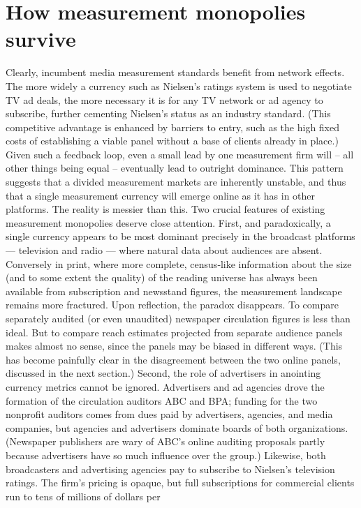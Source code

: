 \section{How measurement monopolies survive}
Clearly, incumbent media measurement standards benefit from network
effects. The more widely a currency such as Nielsen’s ratings system is
used to negotiate TV ad deals, the more necessary it is for any TV network
or ad agency to subscribe, further cementing Nielsen’s status as an
industry standard. (This competitive advantage is enhanced by barriers to
entry, such as the high fixed costs of establishing a viable panel without a
base of clients already in place.) Given such a feedback loop, even a small
lead by one measurement firm will – all other things being equal –
eventually lead to outright dominance. This pattern suggests that a
divided measurement markets are inherently unstable, and thus that a
single measurement currency will emerge online as it has in other
platforms.
The reality is messier than this. Two crucial features of existing
measurement monopolies deserve close attention. First, and
paradoxically, a single currency appears to be most dominant precisely in
the broadcast platforms — television and radio — where natural data
about audiences are absent. Conversely in print, where more complete,
census‐like information about the size (and to some extent the quality) of
the reading universe has always been available from subscription and
newsstand figures, the measurement landscape remains more fractured.
Upon reflection, the paradox disappears. To compare separately audited
(or even unaudited) newspaper circulation figures is less than ideal. But to
compare reach estimates projected from separate audience panels makes
almost no sense, since the panels may be biased in different ways. (This
has become painfully clear in the disagreement between the two online
panels, discussed in the next section.)
Second, the role of advertisers in anointing currency metrics cannot be
ignored. Advertisers and ad agencies drove the formation of the
circulation auditors ABC and BPA; funding for the two nonprofit auditors
comes from dues paid by advertisers, agencies, and media companies, but
agencies and advertisers dominate boards of both organizations.
(Newspaper publishers are wary of ABC’s online auditing proposals
partly because advertisers have so much influence over the group.)
Likewise, both broadcasters and advertising agencies pay to subscribe to
Nielsen’s television ratings. The firm’s pricing is opaque, but full
subscriptions for commercial clients run to tens of millions of dollars per
